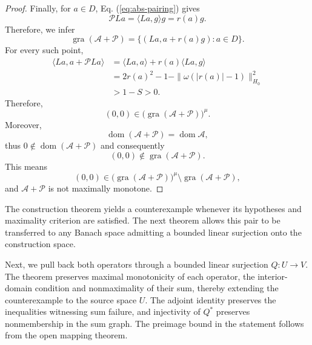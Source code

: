 \documentclass[11pt]{article}
\newcommand{\gra}{\operatorname{gra}}
\newcommand{\dom}{\operatorname{dom}}
\newcommand{\pair}[2]{\langle #1,#2\rangle}
\theoremstyle{definition}
\theoremstyle{remark}
\begin{document}
\begin{proof}
Finally, for $a\in D$, Eq. (\ref{eq:abs-pairing}) gives
\[
\mathcal PLa
=
\pair{La}{g}g
=
r(a)g.
\]
Therefore, we infer 
\[
\gra(\mathcal A+\mathcal P)
=
\{(La,a+r(a)g):a\in D\}.
\]
For every such point,
\[
\begin{aligned}
\pair{La}{a+\mathcal PLa}
&=\pair{La}{a}+r(a)\pair{La}{g}\\
&=2r(a)^2-1-\|\omega(|r(a)|-1)\|_{H_0}^2\\
&>1-S>0.
\end{aligned}
\]
Therefore,
\[
(0,0)\in
\bigl(\gra(\mathcal A+\mathcal P)\bigr)^\mu.
\]
Moreover,
\[
\dom(\mathcal A+\mathcal P)
=
\dom\mathcal A,
\]
thus $0\notin\dom(\mathcal A+\mathcal P)$ and consequently
\[
(0,0)\notin\gra(\mathcal A+\mathcal P).
\]
This means
\[
(0,0)\in
\bigl(\gra(\mathcal A+\mathcal P)\bigr)^\mu
\setminus
\gra(\mathcal A+\mathcal P),
\]
and $\mathcal A+\mathcal P$ is not maximally monotone.
\end{proof}

The construction theorem yields a counterexample whenever its hypotheses and maximality criterion are satisfied. The next theorem allows this pair to be transferred to any Banach space admitting a bounded linear surjection onto the construction space.

Next, we pull back both operators through a bounded linear surjection $Q:U\to V$. The theorem preserves maximal monotonicity of each operator, the interior-domain condition and nonmaximality of their sum, thereby extending the counterexample to the source space $U$. The adjoint identity preserves the inequalities witnessing sum failure, and injectivity of $Q^*$ preserves nonmembership in the sum graph. The preimage bound in the statement follows from the open mapping theorem.
\end{document}
